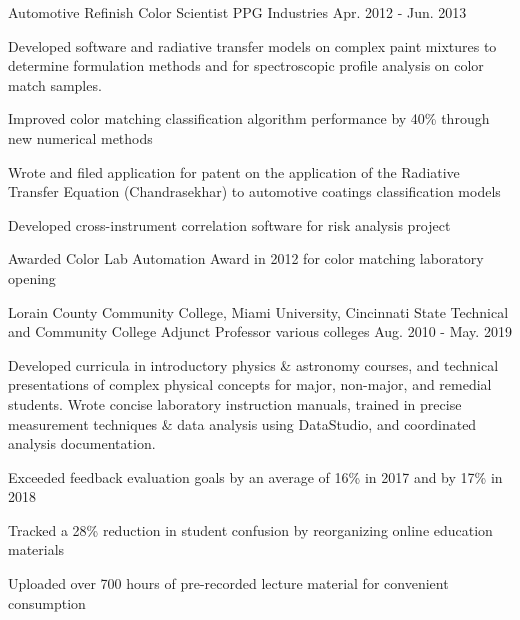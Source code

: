 \begin{cventries}
  \cventry
    {Automotive Refinish} %
    {Color Scientist} %
    {PPG Industries} %
    {Apr. 2012 - Jun. 2013} %
    {
      \begin{cvparagraph}
        Developed software and radiative transfer models on complex paint mixtures to determine formulation methods and for spectroscopic profile analysis on color match samples.
      \end{cvparagraph}
      \begin{cvitems} %
        \item {Improved color matching classification algorithm performance by 40\% through new numerical methods}
        \item {Wrote and filed application for patent on the application of the Radiative Transfer Equation (Chandrasekhar) to automotive coatings classification models}
        \item {Developed cross-instrument correlation software for risk analysis project}
        \item {Awarded Color Lab Automation Award in 2012 for color matching laboratory opening}
      \end{cvitems}
    }

  \cventry
    {Lorain County Community College, Miami University, Cincinnati State Technical and Community College} %
    {Adjunct Professor} %
    {various colleges} %
    {Aug. 2010 - May. 2019} %
    {
      \begin{cvparagraph}
        Developed curricula in introductory physics \& astronomy courses, and technical presentations of complex physical concepts for major, non-major, and remedial students.  Wrote concise laboratory instruction manuals, trained in precise measurement techniques \& data analysis using DataStudio, and coordinated analysis documentation.
      \end{cvparagraph}
      \begin{cvitems} %
        \item {Exceeded feedback evaluation goals by an average of 16\% in 2017 and by 17\% in 2018}
        \item {Tracked a 28\% reduction in student confusion by reorganizing online education materials}
        \item {Uploaded over 700 hours of pre-recorded lecture material for convenient consumption}
      \end{cvitems}
    }


\end{cventries}
